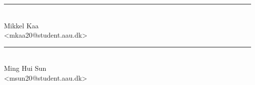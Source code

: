 \begin{center}
\begin{minipage}[b]{0.45\textwidth}
 \centering
 \rule{\textwidth}{0.5pt}\\
  Mikkel Kaa\\
 {\footnotesize <mkaa20@student.aau.dk>}
\end{minipage}
\hfill
\begin{minipage}[b]{0.45\textwidth}
 \centering
 \rule{\textwidth}{0.5pt}\\
  Ming Hui Sun\\
 {\footnotesize <msun20@student.aau.dk>}
\end{minipage}
\end{center}
